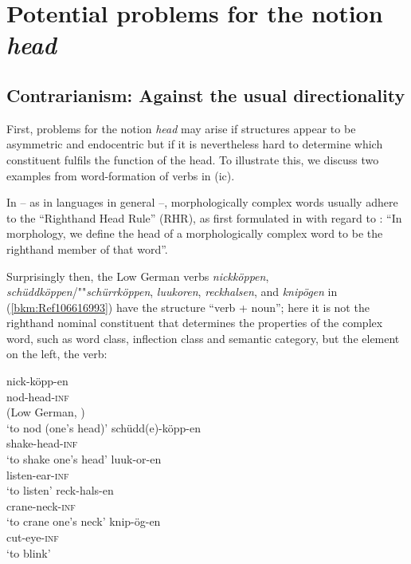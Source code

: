 \documentclass[output=paper
  ,nobabel
  ,draftmode
  ,colorlinks, citecolor=brown
]{langscibook}
\begin{document}
\section{Potential problems for the notion \emph{head}}

\subsection{Contrarianism: Against the usual directionality} 

First, problems for the notion \emph{head} may arise if structures appear to be asymmetric and
endocentric but if it is nevertheless hard to determine which constituent fulfils the function of
the head. To illustrate this, we discuss two examples from word-formation of verbs in (ic).

In  – as in  languages in general –, morphologically complex words usually adhere to
the ``Righthand Head Rule'' (RHR), as first formulated in \citet[248]{Williams1981} with regard to
: “In morphology, we define the head of a morphologically complex word to be the righthand
member of that word''.

\largerpage
Surprisingly then, the Low German verbs \emph{nickköppen}, \emph{schüddköppen}/""\hspace{-1pt}\emph{schürr\-köppen},
\emph{luukoren}, \emph{reckhalsen}, and \emph{knipögen} in (\ref{bkm:Ref106616993}) have the
structure “verb + noun''; here it is not the righthand nominal constituent that determines the
properties of the complex word, such as word class, inflection class and semantic category, but the
element on the left, the verb:

\eal
\label{bkm:Ref106388120}\label{bkm:Ref106616993}
\ex
\gll nick-köpp-en\\
     nod-head-\textsc{inf} \\\hfill(Low German, \citealt[50--52]{AsdahlHolmberg1973})\\
\glt `to nod (one's head)'
\ex
\gll schüdd(e)-köpp-en\\
     shake-head-\textsc{inf} \\
\glt `to shake one's head'
\ex
\gll luuk-or-en\\
       listen-ear-\textsc{inf} \\
\glt   `to listen'
\ex 
\gll reck-hals-en\\
       crane-neck-\textsc{inf} \\
\glt   `to crane one's neck'
\ex
\gll knip-ög-en\\
       cut-eye-\textsc{inf} \\
\glt   `to blink'
\zl
\end{document}
